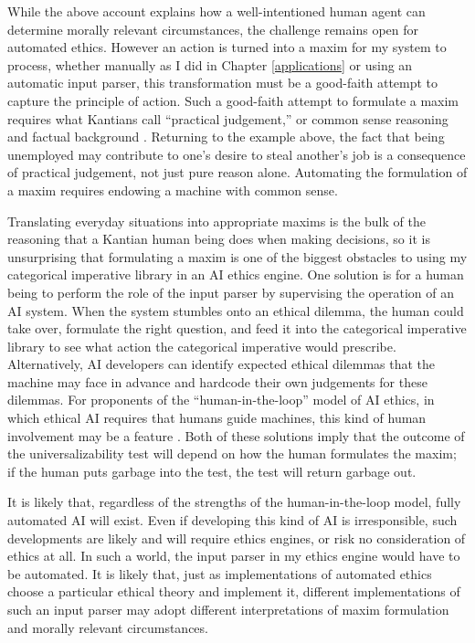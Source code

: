 \begin{isabellebody}
\begin{isamarkuptext}
While the above account explains how a well-intentioned human agent can determine 
morally relevant circumstances, the challenge remains open for automated ethics. However an action is turned into a maxim for my system 
to process, whether manually as I did in Chapter \ref{applications} or using an automatic input 
parser, this transformation must be a good-faith attempt to capture the principle of action. 
Such a good-faith attempt to formulate a maxim requires what Kantians call ``practical judgement,'' or
common sense reasoning and factual background \citep{oneilluniversallaws}. Returning to the example above, the fact that being 
unemployed may contribute to one's desire to steal another's job is a consequence of practical
judgement, not just pure reason alone. Automating the formulation of a maxim requires
endowing a machine with common sense. 

Translating everyday situations into appropriate maxims is the bulk of the reasoning that a Kantian 
human being does when making decisions, so it is unsurprising that formulating a maxim 
is one of the biggest obstacles to using my categorical imperative library
in an AI ethics engine. One solution is for a human being to perform the role of the input
parser by supervising the operation of an AI system. When the system stumbles onto
an ethical dilemma, the human could take over, formulate
the right question, and feed it into the categorical imperative library to see what action the categorical 
imperative would prescribe. Alternatively, AI developers can identify expected ethical dilemmas 
that the machine may face in advance and hardcode their own judgements for these dilemmas. 
For proponents of the ``human-in-the-loop'' model of AI ethics, in which
ethical AI requires that humans guide machines, this kind of human involvement may be a feature \citep{loop}.
Both of these solutions imply that the outcome of the universalizability test will depend on how the 
human formulates the maxim; if the human puts garbage into the test, the test will return garbage out.

It is likely that, regardless of the strengths of the human-in-the-loop model, fully automated AI 
will exist. Even if developing this kind of AI is irresponsible,
such developments are likely and will require ethics engines, or risk no consideration of ethics at all.
In such a world, the input parser in my ethics engine would have to be automated.
It is likely that, just as implementations of automated ethics choose 
a particular ethical theory and implement it, different implementations of such an input parser may 
adopt different interpretations of maxim formulation and morally relevant circumstances. 


\end{isamarkuptext}
\end{isabellebody}
